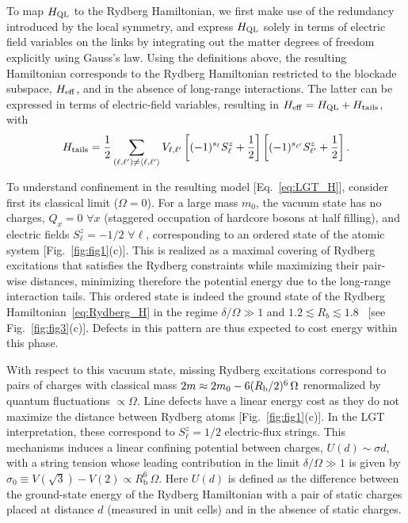 \documentclass[footinbib,a4paper,aps,superscriptaddress,twocolumn,preprintnumbers,amsmath,amssymb,nobalancelastpage,10pt,prl]{revtex4-2}
\begin{document}
{To map $H_{\rm QL}$ to the Rydberg Hamiltonian, we first make use of the redundancy introduced by the local symmetry, and express $H_{\rm QL}$ solely in terms of electric field variables on the links by integrating out the matter degrees of freedom explicitly using Gauss's law. Using the definitions above, the resulting Hamiltonian corresponds to the Rydberg Hamiltonian restricted to the blockade subspace, $H_{\rm eff}$, and in the absence of long-range interactions. The latter can be expressed in terms of electric-field variables, resulting in $H_{\rm eff} = H_{\rm QL} 
 + H_{\rm tails}$, with
\begin{equation}
H_{\rm tails} = \frac{1}{2}\sum_{(\ell, \ell^\prime)\neq \langle\ell, \ell^\prime\rangle }V_{\ell,\ell^\prime}\left[(-1)^{s_\ell}S^z_\ell + \frac{1}{2}\right]\left[(-1)^{s_{\ell^\prime}}S^z_{\ell^\prime} + \frac{1}{2}\right].
\end{equation}

To understand confinement in the resulting model [Eq.~\eqref{eq:LGT_H}], consider first its classical limit ($\Omega = 0$). For a large mass $m_0$, the vacuum state has no charges, $Q_x = 0$ $\forall x$ (staggered occupation of hardcore bosons at half filling), and electric fields $S^z_\ell = -1/2$ $\forall \ell$, corresponding to an ordered state of the atomic system [Fig.~\ref{fig:fig1}(c)]. This is realized as a maximal covering of Rydberg excitations that satisfies the Rydberg constraints while maximizing their pair-wise distances, minimizing therefore the potential energy due to the long-range interaction tails. This ordered state is indeed the ground state of the Rydberg Hamiltonian~\eqref{eq:Rydberg_H} in the regime $\delta/\Omega \gg 1$ and $1.2 \lesssim R_b \lesssim 1.8$~\cite{Samajdar_2021} [see Fig.~\ref{fig:fig3}(c)].
Defects in this pattern are thus expected to cost energy within this phase.

With respect to this vacuum state, missing Rydberg excitations correspond to pairs of charges with classical mass $2m \approx 2m_0  - 6(R_{\rm b}/2)^6\,\Omega$ renormalized by quantum fluctuations $\propto \Omega$. Line defects have a linear energy cost as they do not maximize the distance between Rydberg atoms [Fig.~\ref{fig:fig1}(c)]. In the LGT interpretation, these correspond to $S^z_\ell = 1/2$ electric-flux strings. This mechanisms induces a linear confining potential between charges, $U(d) \sim \sigma d$, with a string tension whose leading contribution in the limit $\delta / \Omega \gg 1$ is given by $\sigma_0 \equiv V(\sqrt{3}) - V(2) \propto R^6_{\mathrm{b}}\,\Omega$. Here $U(d)$ is defined as the difference between the ground-state energy of the Rydberg Hamiltonian with a pair of static charges placed at distance $d$ (measured in unit cells) and in the absence of static charges. 



}
\end{document}
